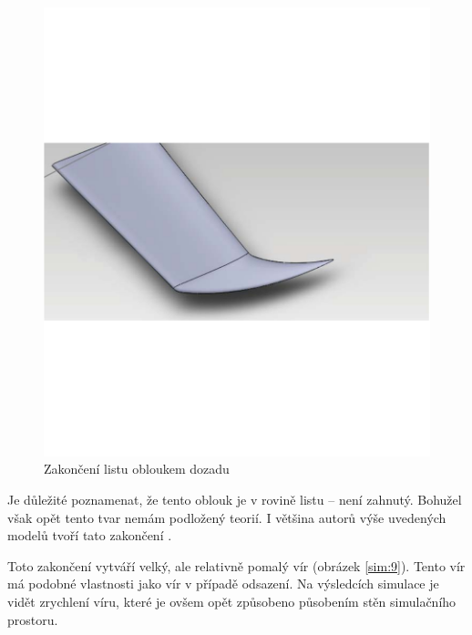 \begin{figure}[H]
	\centering
	\includegraphics[]{obrazky/simulace/konec3p}
	\caption{Zakončení listu obloukem dozadu}
	\label{konec:3}
\end{figure}

Je důležité poznamenat, že tento oblouk je v rovině listu – není zahnutý. Bohužel však opět tento tvar nemám podložený teorií. I většina autorů výše uvedených modelů tvoří tato zakončení .

Toto zakončení vytváří velký, ale relativně pomalý vír (obrázek \ref{sim:9}). Tento vír má podobné vlastnosti jako vír v případě odsazení. Na výsledcích simulace je vidět zrychlení víru, které je ovšem opět způsobeno působením stěn simulačního prostoru.

